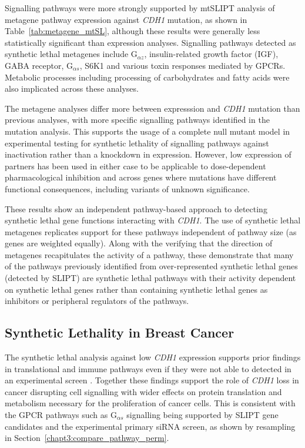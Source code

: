 Signalling pathways were more strongly supported by mtSLIPT analysis of metagene pathway expression against \textit{CDH1} mutation, as shown in Table~\ref{tab:metagene_mtSL}, although these results were generally less statistically significant than expression analyses. Signalling pathways detected as synthetic lethal metagenes include G$_{\alpha z}$, insulin-related growth factor (IGF), GABA receptor, G$_{\alpha s}$, S6K1 and various toxin responses mediated by GPCRs. Metabolic processes including processing of carbohydrates and fatty acids were also implicated across these analyses.

The metagene analyses differ more between expresssion and \textit{CDH1} mutation than previous analyses, with more specific signalling pathways identified in the mutation analysis. This supports the usage of a complete null mutant model in experimental testing for synthetic lethality of signalling pathways against  inactivation rather than a knockdown in expression. However, low expression of partners has been used in either case to be applicable to dose-dependent pharmacological inhibition and across genes where mutations have different functional consequences, including variants of unknown significance. 

These results show an independent pathway-based approach to detecting synthetic lethal gene functions interacting with \textit{CDH1}. The use of synthetic lethal metagenes replicates support for these pathways independent of pathway size (as genes are weighted equally). Along with the verifying that the direction of metagenes recapitulates the activity of a pathway, these demonstrate that many of the pathways previously identified from over-represent\-ed synthetic lethal genes (detected by \gls{SLIPT}) are synthetic lethal pathways with their activity dependent on synthetic lethal genes rather than containing synthetic lethal genes as inhibitors or peripheral regulators of the pathways.

\subsection{Synthetic Lethality in Breast Cancer}

The synthetic lethal analysis against low \textit{CDH1} expression supports prior findings in translational and immune pathways even if they were not able to detected in an experimental screen \citep{Telford2015}. Together these findings support the role of \textit{CDH1} loss in cancer disrupting cell signalling with wider effects on protein translation and metabolism necessary for the proliferation of cancer cells. This is consistent with the GPCR pathways such as G$_{\alpha s}$ signalling being supported by \gls{SLIPT} gene candidates and the experimental primary siRNA screen, as shown by resampling in Section~\ref{chapt3:compare_pathway_perm}.

